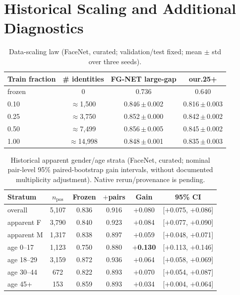 \documentclass[journal]{IEEEtran}
\begin{document}

\section{Historical Scaling and Additional Diagnostics}
\begin{table}[!t]
\caption{Data-scaling law (FaceNet, curated; validation/test fixed; mean $\pm$ std over three seeds).}
\label{tab:supp-scaling}
\centering
\footnotesize
\begin{tabular}{@{}lccc@{}}
\toprule
Train fraction & \# identities & FG-NET large-gap & our.25+ \\
\midrule
frozen & 0 & 0.736 & 0.640 \\
0.10 & $\approx$1{,}500 & 0.846\,$\pm$\,0.002 & 0.816\,$\pm$\,0.003 \\
0.25 & $\approx$3{,}750 & 0.852\,$\pm$\,0.000 & 0.842\,$\pm$\,0.002 \\
0.50 & $\approx$7{,}499 & 0.856\,$\pm$\,0.005 & 0.845\,$\pm$\,0.002 \\
1.00 & $\approx$14{,}998 & 0.848\,$\pm$\,0.001 & 0.835\,$\pm$\,0.003 \\
\bottomrule
\end{tabular}
\end{table}

\begin{table}[!t]
\caption{Historical apparent gender/age strata (FaceNet, curated; nominal pair-level 95\% paired-bootstrap gain intervals, without documented multiplicity adjustment). Native rerun/provenance is pending.}
\label{tab:supp-strata}
\centering
\footnotesize
\begin{tabular}{@{}lccccc@{}}
\toprule
Stratum & $n_{\text{pos}}$ & Frozen & $+$pairs & Gain & 95\% CI \\
\midrule
overall & 5{,}107 & 0.836 & 0.916 & $+$0.080 & [$+$0.075, $+$0.086] \\
apparent F & 3{,}790 & 0.840 & 0.923 & $+$0.084 & [$+$0.077, $+$0.090] \\
apparent M & 1{,}317 & 0.838 & 0.897 & $+$0.059 & [$+$0.048, $+$0.071] \\
age 0--17 & 1{,}123 & 0.750 & 0.880 & \textbf{$+$0.130} & [$+$0.113, $+$0.146] \\
age 18--29 & 3{,}159 & 0.872 & 0.936 & $+$0.064 & [$+$0.058, $+$0.069] \\
age 30--44 & 672 & 0.822 & 0.893 & $+$0.070 & [$+$0.054, $+$0.087] \\
age 45+ & 153 & 0.859 & 0.893 & $+$0.034 & [$+$0.004, $+$0.064] \\
\bottomrule
\end{tabular}
\end{table}
\end{document}
